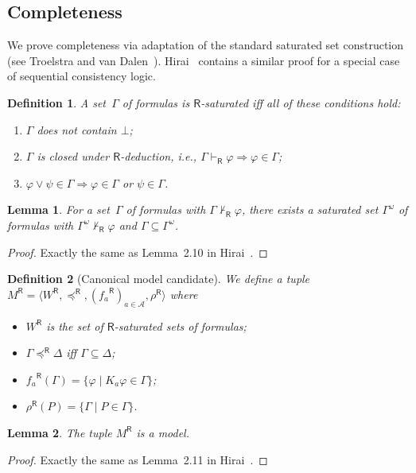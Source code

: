 \documentclass[doctor]{iscs-thesis}
\newcommand{\agents}{\mathcal A}
\newcommand{\tuple}[1]{\langle{#1}\rangle}
\newcommand{\vdashR}{\vdash_{\mathsf R}}
\newcommand{\R}[1]{{#1}^{\mathsf R}}
\newtheorem{definition}{Definition}
\newtheorem{lemma}{Lemma}
\begin{document}
\subsection{Completeness}
We prove completeness via
  adaptation of the standard saturated set construction (see Troelstra
  and van Dalen~\cite[Ch.~2]{troelstra1988constructivism}).
  Hirai~\cite{hirailpar} contains a similar proof for a special case of
  sequential consistency logic.

\begin{definition}
 A set~$\Gamma$ of formulas is
 $\mathsf R$-saturated iff all of these conditions hold:
 \begin{enumerate}
  \item $\Gamma$ does not contain $\bot$;
  \item $\Gamma$ is closed under $\mathsf R$-deduction, i.e.,
	$\Gamma\vdashR\varphi\Rightarrow\varphi\in\Gamma$;
  \item $\varphi\vee\psi\in\Gamma\Rightarrow\varphi\in\Gamma$ or $\psi\in\Gamma$.
 \end{enumerate}
\end{definition}

\begin{lemma}
 \label{hoe:saturation}
 For a set~$\Gamma$ of formulas with $\Gamma\not\vdashR\varphi$,
 there exists a
 saturated set $\Gamma^{\omega}$ of formulas with
 $\Gamma^{\omega}\not\vdashR\varphi$ and
 $\Gamma\subseteq \Gamma^{\omega}$.
\end{lemma}
\begin{proof}
 Exactly the same as Lemma~2.10 in Hirai~\cite{hirailpar}.
\end{proof}


\begin{definition}[Canonical model candidate]
 We define a tuple
 $\R M = \tuple{\R W, \R\preceq, (\R{f_a})_{a\in \agents}, \R\rho}$
 where
 \begin{itemize}
  \item $\R W$ is the set of $\mathsf R$-saturated sets of formulas;
  \item $\Gamma\R\preceq \Delta$ iff $\Gamma\subseteq\Delta$;
  \item $\R{f_a}(\Gamma) = \{\varphi\mid K_a\varphi\in\Gamma\}$;
  \item $\R\rho(P)=\{\Gamma\mid P\in \Gamma\}$.
 \end{itemize}
\end{definition}

\begin{lemma}
 The tuple $\R M$ is a model.
\end{lemma}
\begin{proof}
 Exactly the same as Lemma~2.11 in Hirai~\cite{hirailpar}.
\end{proof}
\end{document}
